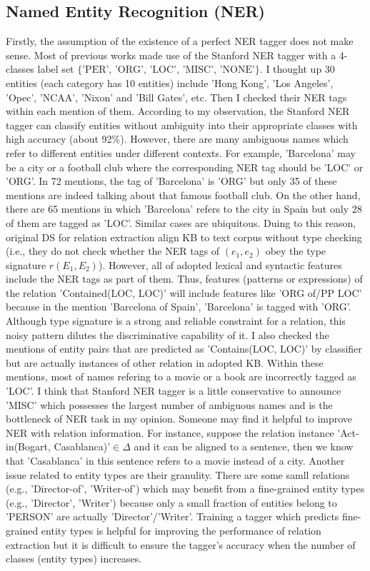 \documentclass[10pt]{article} %
\theoremstyle{definition}
\theoremstyle{definition}
\begin{document}
\subsection{Named Entity Recognition (NER)}
Firstly, the assumption of the existence of a perfect NER tagger does not make sense. 
Most of previous works made use of the Stanford NER tagger with a 4-classes label set $\{\text{'PER', 'ORG', 'LOC', 'MISC', 'NONE'}\}$. 
I thought up 30 entities (each category has 10 entities) include 'Hong Kong', 'Los Angeles', 'Opec', 'NCAA', 'Nixon' and 'Bill Gates', etc.
Then I checked their NER tags within each mention of them. 
According to my observation, the Stanford NER tagger can classify entities without ambiguity into their appropriate classes with high accuracy (about 92\%). 
However, there are many ambiguous names which refer to different entities under different contexts. 
For example, 'Barcelona' may be a city or a football club where the corresponding NER tag should be 'LOC' or 'ORG'. 
In 72 mentions, the tag of 'Barcelona' is 'ORG' but only 35 of these mentions are indeed talking about that famous football club. 
On the other hand, there are 65 mentions in which 'Barcelona' refers to the city in Spain but only 28 of them are tagged as 'LOC'. 
Similar cases are ubiquitous. 
Duing to this reason, original DS for relation extraction align KB to text corpus without type checking 
(i.e., they do not check whether the NER tags of $(e_1,e_2)$ obey the type signature $r(E_1,E_2)$). 
However, all of adopted lexical and syntactic features include the NER tags as part of them. 
Thus, features (patterns or expressions) of the relation 'Contained(LOC, LOC)' will include features like 'ORG of/PP LOC' 
because in the mention 'Barcelona of Spain', 'Barcelona' is tagged with 'ORG'. 
Although type signature is a strong and reliable constraint for a relation, this noisy pattern dilutes the discriminative capability of it. 
I also checked the mentions of entity pairs that are predicted as 'Contains(LOC, LOC)' by classifier but are actually instances of other relation in adopted KB. 
Within these mentions, most of names refering to a movie or a book are incorrectly tagged as 'LOC'. 
I think that Stanford NER tagger is a little conservative to announce 'MISC' which possesses the largest number of ambiguous names and is the bottleneck of NER task in my opinion. 
Someone may find it helpful to improve NER with relation information. 
For instance, suppose the relation instance 'Act-in(Bogart, Casablanca)'$\in\Delta$ and it can be aligned to a sentence, then we know that 'Casablanca' in this sentence refers to a movie instead of a city. 
Another issue related to entity types are their granulity. 
There are some samll relations (e.g., 'Director-of', 'Writer-of') which may benefit from a fine-grained entity types (e.g., 'Director', 'Writer') because only a small fraction of entities belong to 'PERSON' are actually 'Director'/'Writer'. 
Training a tagger which predicts fine-grained entity types is helpful for improving the performance of relation extraction but it is difficult to ensure the tagger's accuracy when the number of classes (entity types) increases. 
\end{document}
